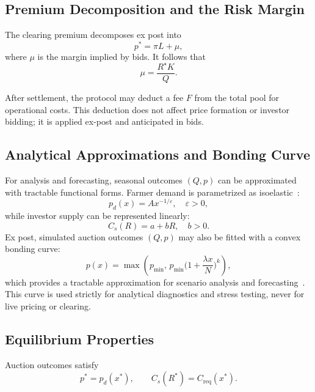 \documentclass[11pt,a4paper]{article}
\begin{document}
        \subsection{Premium Decomposition and the Risk Margin}\label{subsec:premium-decomposition}
        The clearing premium decomposes ex post into
        \[
            p^\ast = \hat{\pi}L + \mu,
        \]
        where $\mu$ is the margin implied by bids.
        It follows that
        \[
            \mu = \frac{R^\star K}{Q}.
        \]

        After settlement, the protocol may deduct a fee $F$ from the total pool for operational costs.
        This deduction does not affect price formation or investor bidding; it is applied ex-post and anticipated in bids.

        \subsection{Analytical Approximations and Bonding Curve}\label{subsec:bonding-curve}
        For analysis and forecasting, seasonal outcomes $(Q,p)$ can be approximated with tractable functional forms.
        Farmer demand is parametrized as isoelastic~\parencite{mascolell1995microeconomic,varian1992micro}:
        \[
            p_d(x) = A x^{-1/\varepsilon}, \quad \varepsilon > 0,
        \]
        while investor supply can be represented linearly:
        \[
            C_s(R) = a + bR, \quad b > 0.
        \]
        Ex post, simulated auction outcomes $(Q,p)$ may also be fitted with a convex bonding curve:
        \[
            p(x) = \max\!\left(p_{\min},\, p_{\min}\Big(1+\frac{\lambda x}{N}\Big)^k\right),
        \]
        which provides a tractable approximation for scenario analysis and forecasting~\parencite{angeris2020improved,shiller2003bond}.
        This curve is used strictly for analytical diagnostics and stress testing, never for live pricing or clearing.

        \subsection{Equilibrium Properties}\label{subsec:equilibrium-properties}
        Auction outcomes satisfy
        \[
            p^\ast = p_d(x^\ast), \qquad C_s(R^\ast) = C_{\mathrm{req}}(x^\ast).
        \]
\end{document}
